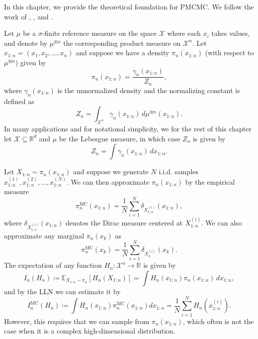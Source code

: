 In this chapter, we provide the theoretical foundation for \gls*{PMCMC}. We follow the work of \cite{Andrieu}, \cite{Doucet}, and \cite{kroese2013handbook}.

Let $\mu$ be a $\sigma$-finite reference measure on the space $\mathcal{X}$ where each $x_i$ takes values, and denote by $\mu^{\otimes n}$ the corresponding product measure on $\mathcal{X}^n$. Let $x_{1:n} = (x_1, x_2, \dots, x_n)$ and suppose we have a density $\pi_n(x_{1:n})$ (with respect to $\mu^{\otimes n}$) given by
\begin{equation}
	\pi_n(x_{1:n}) = \frac{\gamma_n(x_{1:n})}{Z_n}, \label{eq:density}
\end{equation}
where $\gamma_n(x_{1:n})$ is the unnormalized density and the normalizing constant is defined as
\[
Z_n = \int_{\mathcal{X}^n} \gamma_n(x_{1:n})\, d\mu^{\otimes n}(x_{1:n}).
\]
In many applications and for notational simplicity, we for the rest of this chapter let $\mathcal{X} \subseteq \mathbb{R}^d$ and $\mu$ be the Lebesgue measure, in which case  $Z_n$ is given by
\begin{equation}
	Z_n = \int \gamma_n(x_{1:n})\, dx_{1:n}.
	\label{eq:normalizing_constant}
\end{equation}

Let $X_{1:n}\sim \pi_n(x_{1:n})$ and suppose we generate $N$ i.i.d. samples $x_{1:n}^{(1)},x_{1:n}^{(2)},\dots,x_{1:n}^{(N)}$. We can then approximate $\pi_n(x_{1:n})$ by the empirical measure
\[
{\pi}_n^{\text{MC}}(x_{1:n})=\frac{1}{N} \sum_{i=1}^N \delta_{X_{1:n}^{(i)}}(x_{1:n}),
\]
where $\delta_{X_{1:n}^{(i)}}(x_{1:n})$ denotes the Dirac measure centered at $X_{1:n}^{(i)}$. We can also approximate any marginal $\pi_n(x_k)$ as
\[
{\pi}_n^{\text{MC}}(x_k)=\frac{1}{N} \sum_{i=1}^N \delta_{X_{k}^{(i)}}(x_{k}).
\]
The expectation of any function $H_n: \mathcal{X}^n \to \mathbb{R}$ is given by
\[
I_n(H_n)\coloneq \mathbb{E}_{X_{1:n} \sim \pi_n}[H_n(X_{1:n})]=\int H_n(x_{1:n})\pi_n(x_{1:n})\, dx_{1:n},
\]
and by the \gls*{LLN} we can estimate it by
\[
I_n^{\text{MC}}(H_n) \coloneq \int H_n(x_{1:n})\pi_n^{\text{MC}}(x_{1:n})dx_{1:n}=\frac{1}{N}\sum_{i=1}^NH_n(x_{1:n}^{(i)}).
\]
However, this requires that we can sample from $\pi_n(x_{1:n})$, which often is not the case when it is a complex high-dimensional distribution. 
